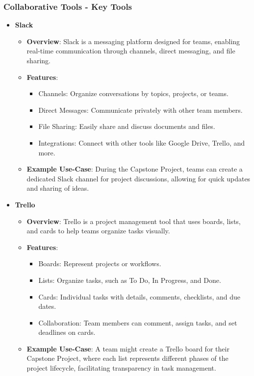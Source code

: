 \documentclass[aspectratio=169]{beamer}
\begin{document}
\begin{frame}[fragile]
    \frametitle{Collaborative Tools - Key Tools}
    \begin{itemize}
        \item \textbf{Slack}
        \begin{itemize}
            \item \textbf{Overview}: Slack is a messaging platform designed for teams, enabling real-time communication through channels, direct messaging, and file sharing.
            \item \textbf{Features}:
            \begin{itemize}
                \item Channels: Organize conversations by topics, projects, or teams.
                \item Direct Messages: Communicate privately with other team members.
                \item File Sharing: Easily share and discuss documents and files.
                \item Integrations: Connect with other tools like Google Drive, Trello, and more.
            \end{itemize}
            \item \textbf{Example Use-Case}: During the Capstone Project, teams can create a dedicated Slack channel for project discussions, allowing for quick updates and sharing of ideas.
        \end{itemize}

        \item \textbf{Trello}
        \begin{itemize}
            \item \textbf{Overview}: Trello is a project management tool that uses boards, lists, and cards to help teams organize tasks visually.
            \item \textbf{Features}:
            \begin{itemize}
                \item Boards: Represent projects or workflows.
                \item Lists: Organize tasks, such as To Do, In Progress, and Done.
                \item Cards: Individual tasks with details, comments, checklists, and due dates.
                \item Collaboration: Team members can comment, assign tasks, and set deadlines on cards.
            \end{itemize}
            \item \textbf{Example Use-Case}: A team might create a Trello board for their Capstone Project, where each list represents different phases of the project lifecycle, facilitating transparency in task management.
        \end{itemize}
    \end{itemize}
\end{frame}
\end{document}
